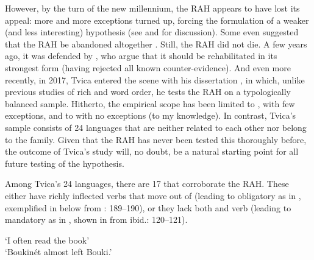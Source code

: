 \documentclass[output=paper,colorlinks,citecolor=brown,draft,draftmode]{langscibook}
\begin{document}
However, by the turn of the new millennium, the RAH appears to have lost its appeal: more and more exceptions turned up, forcing the formulation of a weaker (and less interesting) hypothesis (see \citealt{BobaljikThrainsson1998} and \citealt{Sundquist2003} for discussion). Some even suggested that the RAH be abandoned altogether \citep{WiklundEtAl2007}. Still, the RAH did not die. A few years ago, it was defended by \citet{KoenemanZeijlstra2014}, who argue that it should be rehabilitated in its strongest form (having rejected all known counter-evidence). And even more recently, in 2017, Tvica entered the scene with his dissertation \citep{Tvica2017}, in which, unlike previous studies of rich  and word order, he tests the RAH on a typologically balanced sample. Hitherto, the empirical scope has been limited to , with few exceptions, and to  with no exceptions (to my knowledge). In contrast, Tvica’s sample consists of 24 languages that are neither related to each other nor belong to the  family. Given that the RAH has never been tested this thoroughly before, the outcome of Tvica’s study will, no doubt, be a natural starting point for all future testing of the hypothesis. 



Among Tvica’s 24 languages, there are 17 that corroborate the RAH. These either have richly inflected verbs that move out of  (leading to obligatory  as in , exemplified in  below from \citealt{Tvica2017}: 189–190), or they lack both  and verb  (leading to mandatory  as in , shown in  from ibid.: 120–121).


\ea\label{ex:petzell:25}
\glt `I often read the book’  \\
\glt `Boukinét almost left Bouki.’
\z
\z
\end{document}
